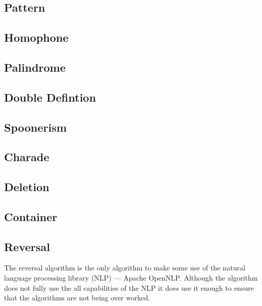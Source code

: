 \subsection{Pattern}

\subsection{Homophone}

\subsection{Palindrome}

\subsection{Double Defintion}

\subsection{Spoonerism}

\subsection{Charade}

\subsection{Deletion}

\subsection{Container}

\subsection{Reversal}

The reversal algorithm is the only algorithm to make some use of the natural 
language processing library (NLP) --- Apache OpenNLP. Although the algorithm 
does not fully use the all capabilities of the NLP it does use it enough to 
ensure that the algorithms are not being over worked.

